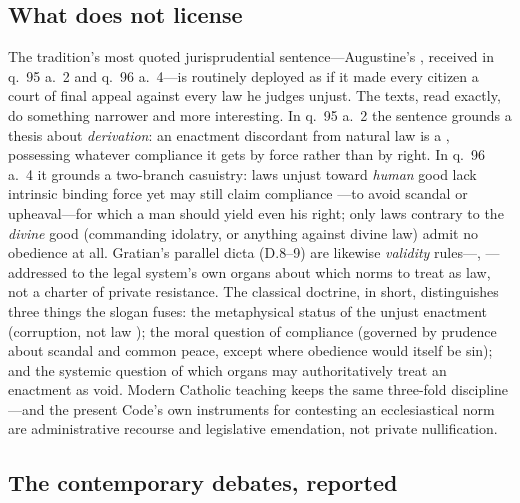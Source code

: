 \subsection{What  does not license}

The tradition's most quoted jurisprudential sentence---Augustine's , received in q.~95 a.~2 and q.~96 a.~4---is routinely deployed as if it made every citizen a court of final appeal against every law he judges unjust. The texts, read exactly, do something narrower and more interesting. In q.~95 a.~2 the sentence grounds a thesis about \emph{derivation}: an enactment discordant from natural law is a , possessing whatever compliance it gets by force rather than by right. In q.~96 a.~4 it grounds a two-branch casuistry: laws unjust toward \emph{human} good lack intrinsic binding force yet may still claim compliance ---to avoid scandal or upheaval---for which a man should yield even his right; only laws contrary to the \emph{divine} good (commanding idolatry, or anything against divine law) admit no obedience at all. Gratian's parallel dicta (D.8--9) are likewise \emph{validity} rules---, ---addressed to the legal system's own organs about which norms to treat as law, not a charter of private resistance. The classical doctrine, in short, distinguishes three things the slogan fuses: the metaphysical status of the unjust enactment (corruption, not law ); the moral question of compliance (governed by prudence about scandal and common peace, except where obedience would itself be sin); and the systemic question of which organs may authoritatively treat an enactment as void. Modern Catholic teaching keeps the same three-fold discipline---and the present Code's own instruments for contesting an ecclesiastical norm are administrative recourse and legislative emendation, not private nullification.

\subsection{The contemporary debates, reported}

